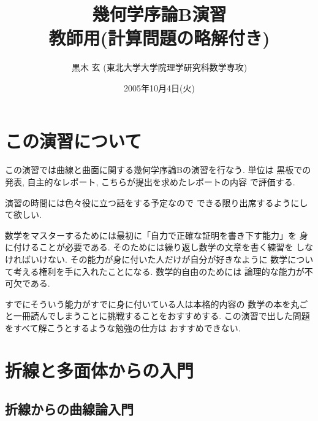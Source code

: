 \documentclass[12pt,twoside]{jarticle}
\begin{document}

\title{\bf 幾何学序論B演習
  \ifx\STUDENT\undefined\\{\normalsize 教師用\quad(計算問題の略解付き)}\fi}

\author{黒木 玄 \quad (東北大学大学院理学研究科数学専攻)}

\date{2005年10月4日(火)}

\maketitle

\tableofcontents


\section{この演習について}

この演習では曲線と曲面に関する幾何学序論Bの演習を行なう. 単位は
黒板での発表, 自主的なレポート, こちらが提出を求めたレポートの内容
で評価する. 

演習の時間には色々役に立つ話をする予定なので
できる限り出席するようにして欲しい.

数学をマスターするためには最初に「自力で正確な証明を書き下す能力」を
身に付けることが必要である. そのためには繰り返し数学の文章を書く練習を
しなければいけない. その能力が身に付いた人だけが自分が好きなように
数学について考える権利を手に入れたことになる. 数学的自由のためには
論理的な能力が不可欠である.

すでにそういう能力がすでに身に付いている人は本格的内容の
数学の本を丸ごと一冊読んでしまうことに挑戦することをおすすめする.
この演習で出した問題をすべて解こうとするような勉強の仕方は
おすすめできない.


\section{折線と多面体からの入門}
\label{sec:intro}


\subsection{折線からの曲線論入門}
\label{sec:oresen}
\end{document}
